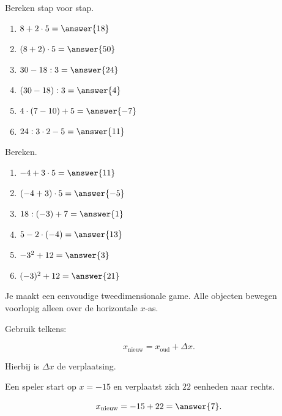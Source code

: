\documentclass{ximera}
\begin{document}

\begin{exercise}
Bereken stap voor stap.

\begin{enumerate}
    \item $8+2\cdot5=\answer{18}$
    \item $(8+2)\cdot5=\answer{50}$
    \item $30-18:3=\answer{24}$
    \item $(30-18):3=\answer{4}$
    \item $4\cdot(7-10)+5=\answer{-7}$
    \item $24:3\cdot2-5=\answer{11}$
\end{enumerate}
\end{exercise}


\begin{exercise}
Bereken.

\begin{enumerate}
    \item $-4+3\cdot5=\answer{11}$
    \item $(-4+3)\cdot5=\answer{-5}$
    \item $18:(-3)+7=\answer{1}$
    \item $5-2\cdot(-4)=\answer{13}$
    \item $-3^2+12=\answer{3}$
    \item $(-3)^2+12=\answer{21}$
\end{enumerate}
\end{exercise}



Je maakt een eenvoudige tweedimensionale game. Alle objecten bewegen voorlopig
alleen over de horizontale $x$-as.

Gebruik telkens:

\[
x_{\text{nieuw}}
=
x_{\text{oud}}
+
\Delta x.
\]

Hierbij is $\Delta x$ de verplaatsing.

\begin{problem}
Een speler start op $x=-15$ en verplaatst zich $22$ eenheden naar rechts.

\[
x_{\text{nieuw}}=-15+22=\answer{7}.
\]
\end{problem}
\end{document}
